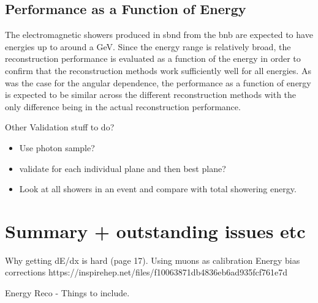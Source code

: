 \subsection{Performance as a Function of Energy}
The electromagnetic showers produced in \gls{sbnd} from the \gls{bnb} are expected to have energies up to around a GeV. 
Since the energy range is relatively broad, the reconstruction performance is evaluated as a function of the energy in order to confirm that the reconstruction methods work sufficiently well for all energies. As was the case for the angular dependence, the performance as a function of energy is expected to be similar across the different reconstruction methods with the only difference being in the actual reconstruction performance. 

\newpage
Other Validation stuff to do?
\begin{itemize}
    \item Use photon sample?
    \item validate for each individual plane and then best plane?
    \item Look at all showers in an event and compare with total showering energy. 
\end{itemize}


\section{Summary + outstanding issues etc}

Why getting dE/dx is hard (page 17).
Using muons as calibration
Energy bias corrections
https://inspirehep.net/files/f10063871db4836eb6ad935fcf761e7d

Energy Reco - Things to include.

